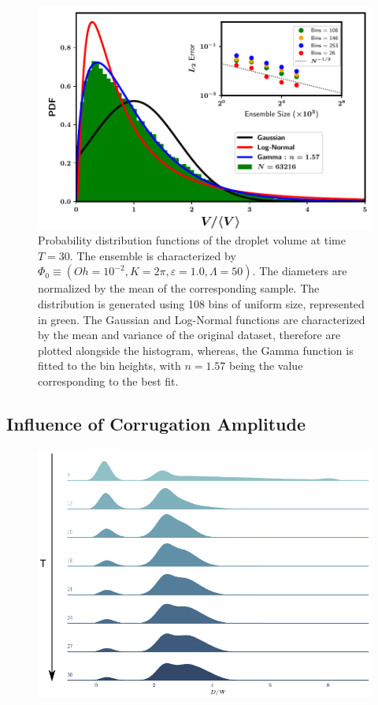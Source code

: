 \begin{figure}
\centering
\includegraphics{plots/drop_stats/long_time_volume_fits.pdf}
\caption{Probability distribution functions of the droplet volume at time $T = 30$. 
The ensemble is characterized by $\Phi_0 \equiv \left( Oh = 10^{-2}, K = 2\pi , \varepsilon = 1.0 , \Lambda = 50 \right)$. 
The diameters are normalized by the mean of the corresponding sample.  
The distribution is generated using 108 bins of uniform size, represented in green.  
The Gaussian and Log-Normal functions are characterized by the mean and variance of the original dataset, 
therefore are plotted alongside the histogram, whereas, the Gamma function is fitted to the bin heights,
with $n= 1.57$ being the value corresponding to the best fit.
	}
\label{t2_vol_fits}
\end{figure}



\subsection*{Influence of Corrugation Amplitude}


\begin{figure}
\centering
\includegraphics{plots/drop_stats/small_amp.pdf}
	\caption{\blindtext}
\label{tseries_small}
\end{figure}


